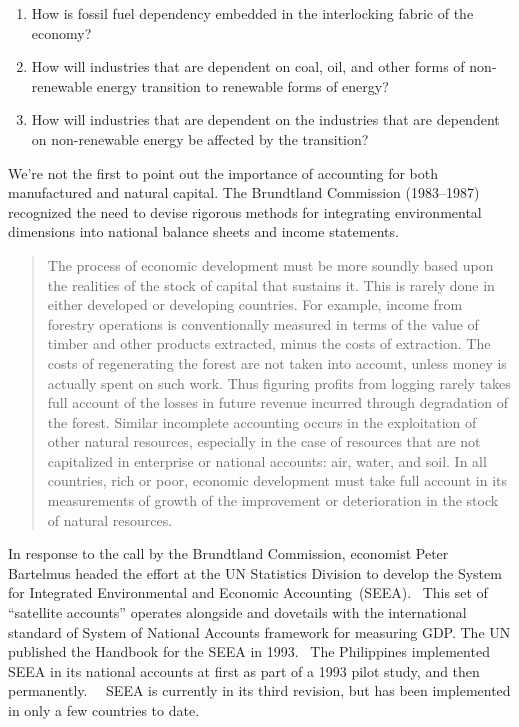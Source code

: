\begin{enumerate}
     \item{How is fossil fuel dependency embedded in the interlocking fabric of the economy?} 
     \item{How will industries that are dependent on coal, oil, 
	 			and other forms of non-renewable energy transition 
				to renewable forms of energy?} 
     \item{How will industries that are dependent 
	 			on the industries that are dependent on non-renewable energy 
				be affected by the transition?} 
\end{enumerate}

We're not the first to point out the importance of accounting 
for both manufactured and natural capital. 
The Brundtland Commission (1983--1987) recognized the need 
to devise rigorous methods for integrating environmental dimensions 
into national balance sheets and income statements.

\begin{quote}
The process of economic development must be more soundly 
based upon the realities of the stock of capital that sustains it. 
This is rarely done in either developed or developing countries. 
For example, income from forestry operations is conventionally measured 
in terms of the value of timber and other products extracted, 
minus the costs of extraction. 
The costs of regenerating the forest are not taken into account, 
unless money is actually spent on such work. 
Thus figuring profits from logging rarely takes full account 
of the losses in future revenue incurred through degradation of the forest. 
Similar incomplete accounting occurs in the exploitation 
of other natural resources, 
especially in the case of resources that are not capitalized 
in enterprise or national accounts: air, water, and soil. 
In all countries, rich or poor, 
economic development must take full account 
in its measurements of growth of the improvement or 
deterioration in the stock of natural resources.~\cite[Chapter 2, para 36]{brundtland1987}
\end{quote}

In response to the call by the Brundtland Commission, 
economist Peter Bartelmus headed the effort at the UN Statistics Division 
to develop the 
System for Integrated Environmental and Economic Accounting~(SEEA).~\cite{Bartelmus1991} 
This set of ``satellite accounts'' operates alongside and dovetails with 
the international standard of System of National Accounts framework for measuring GDP. 
The UN published the Handbook for the SEEA in 1993.~\cite{UNSEEA1993} 
The Philippines implemented SEEA in its national accounts 
at first as part of a 1993 pilot study, 
and then permanently.~\cite{uno1998}~\cite{PhilippinesSEEAWeb} 
SEEA is currently in its third revision, 
but has been implemented 
in only a few countries to date.~\cite{UNSEEAWeb,PhilippinesSEEAWeb} 

